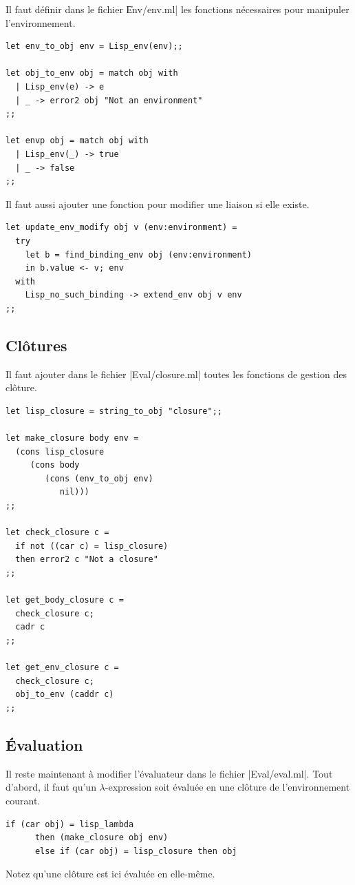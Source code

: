 \documentclass{../../LaTeX/tdsimple}
\begin{document}
Il faut définir dans le fichier \|Env/env.ml| les fonctions
nécessaires pour manipuler l'environnement.
\begin{lstlisting}[language=caml]
let env_to_obj env = Lisp_env(env);;

let obj_to_env obj = match obj with
  | Lisp_env(e) -> e
  | _ -> error2 obj "Not an environment"
;;

let envp obj = match obj with
  | Lisp_env(_) -> true
  | _ -> false
;;
\end{lstlisting}

Il faut aussi ajouter une fonction pour modifier une liaison si elle
existe.
\begin{lstlisting}[language=caml]
let update_env_modify obj v (env:environment) =
  try
    let b = find_binding_env obj (env:environment)
    in b.value <- v; env
  with
    Lisp_no_such_binding -> extend_env obj v env
;;
\end{lstlisting}

\subsection{Clôtures}

Il faut ajouter dans le fichier \file|Eval/closure.ml| toutes les
fonctions de gestion des clôture.
\begin{lstlisting}[language=caml]
let lisp_closure = string_to_obj "closure";;

let make_closure body env =
  (cons lisp_closure
     (cons body
        (cons (env_to_obj env)
           nil)))
;;

let check_closure c =
  if not ((car c) = lisp_closure)
  then error2 c "Not a closure"
;;

let get_body_closure c =
  check_closure c;
  cadr c
;;

let get_env_closure c =
  check_closure c;
  obj_to_env (caddr c)
;;
\end{lstlisting}

\subsection{Évaluation}

Il reste maintenant à modifier l'évaluateur dans le fichier
\file|Eval/eval.ml|. Tout d'abord, il faut qu'un $\lambda$-expression
soit évaluée en une clôture de l'environnement courant.
\begin{lstlisting}[language=caml]
      if (car obj) = lisp_lambda
      then (make_closure obj env)
      else if (car obj) = lisp_closure then obj
\end{lstlisting}
\begin{attention}
  Notez qu'une clôture est ici évaluée en elle-même.
\end{attention}
\end{document}
